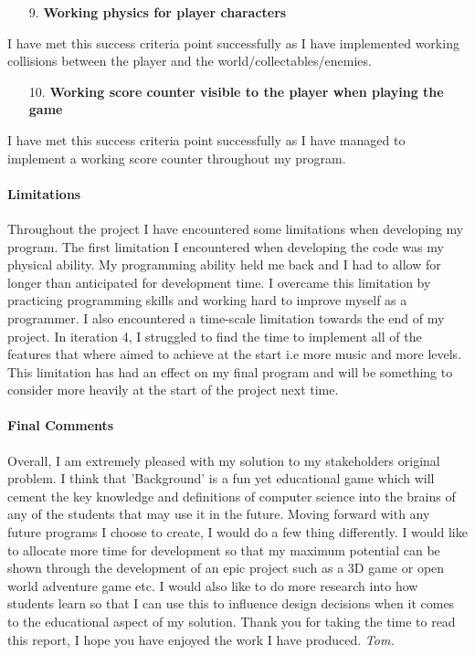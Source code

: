 \documentclass[12pt]{report}
\begin{document}
\begin{enumerate}
    \item[9.] \textbf{Working physics for player characters}
\end{enumerate}

I have met this success criteria point successfully as I have implemented working collisions between the player and the world/collectables/enemies. 

\begin{enumerate}
    \item[10.] \textbf{Working score counter visible to the player when playing the game}
\end{enumerate}

I have met this success criteria point successfully as I have managed to implement a working score counter throughout my program.

\pagebreak
\paragraph{Limitations}
Throughout the project I have encountered some limitations when developing my program. The first limitation I encountered when developing the code was my physical ability. My programming ability held me back and I had to allow for longer than anticipated for development time. I overcame this limitation by practicing programming skills and working hard to improve myself as a programmer. I also encountered a time-scale limitation towards the end of my project. In iteration 4, I struggled to find the time to implement all of the features that where aimed to achieve at the start i.e more music and more levels. This limitation has had an effect on my final program and will be something to consider more heavily at the start of the project next time.

\paragraph{Final Comments}
Overall, I am extremely pleased with my solution to my stakeholders original problem. I think that 'Background' is a fun yet educational game which will cement the key knowledge and definitions of computer science into the brains of any of the students that may use it in the future. Moving forward with any future programs I choose to create, I would do a few thing differently. I would like to allocate more time for development so that my maximum potential can be shown through the development of an epic project such as a 3D game or open world adventure game etc. I would also like to do more research into how students learn so that I can use this to influence design decisions when it comes to the educational aspect of my solution.
\newline
\newline
Thank you for taking the time to read this report, I hope you have enjoyed the work I have produced.
\newline
\newline
\textit{Tom.}
\end{document}
